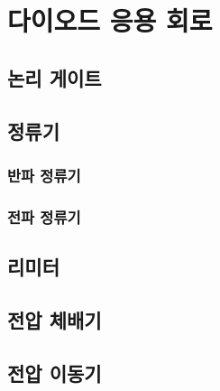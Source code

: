 \chapter{다이오드 응용 회로}
\section{논리 게이트}

\section{정류기}
\subsection{반파 정류기}

\subsection{전파 정류기}

\section{리미터}

\section{전압 체배기}

\section{전압 이동기}